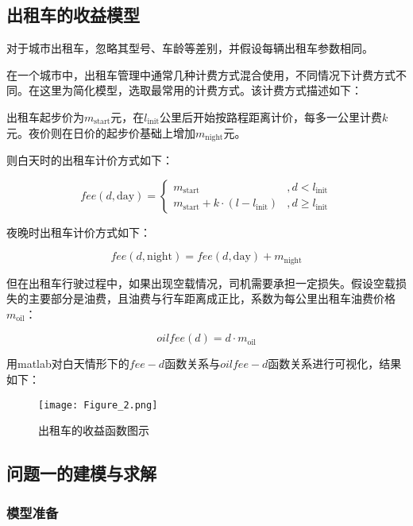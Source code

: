 \documentclass[withoutpreface,bwprint]{cumcmthesis} %
\begin{document}
\subsection{出租车的收益模型}
对于城市出租车，忽略其型号、车龄等差别，并假设每辆出租车参数相同。\par
在一个城市中，出租车管理中通常几种计费方式混合使用，不同情况下计费方式不同。在这里为简化模型，选取最常用的计费方式。该计费方式描述如下：\par
出租车起步价为$m_{\mathrm{start}}$元，在$l_{\mathrm{init}}$公里后开始按路程距离计价，每多一公里计费$k$元。夜价则在日价的起步价基础上增加$m_{\mathrm{night}}$元。\par
则白天时的出租车计价方式如下：\par
\begin{equation}
	fee(d,\mathrm{day})=\left\{
	\begin{array}{lr}
		m_{\mathrm{start}}                               & ,d<l_{\mathrm{init}}    \\
		m_{\mathrm{start}}+ k \cdot(l-l_{\mathrm{init}}) & ,d\ge l_{\mathrm{init}}
	\end{array}
	\right.
\end{equation}

夜晚时出租车计价方式如下：\par
\begin{equation}
	fee(d,\mathrm{night})=fee(d,\mathrm{day})+m_{\mathrm{night}}
\end{equation}

但在出租车行驶过程中，如果出现空载情况，司机需要承担一定损失。假设空载损失的主要部分是油费，且油费与行车距离成正比，系数为每公里出租车油费价格$m_{\mathrm{oil}}$：\par
\begin{equation}
	oilfee(d)=d\cdot m_{\mathrm{oil}}
\end{equation}

用matlab对白天情形下的$fee-d$函数关系与$oilfee-d$函数关系进行可视化，结果如下：\par
\begin{figure}[!h]
	\centering
	\texttt{[image: Figure\_2.png]}
	\caption{出租车的收益函数图示}
\end{figure}

\subsection{问题一的建模与求解}
\subsubsection{模型准备}
\end{document}
